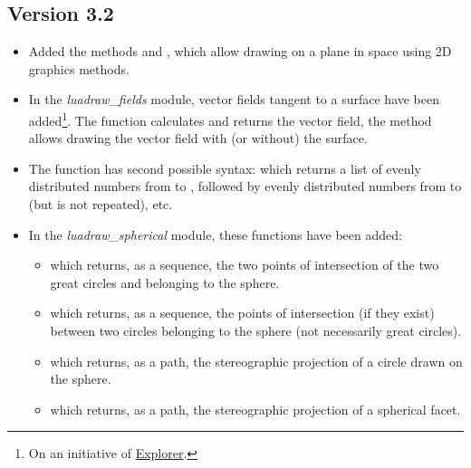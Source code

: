 \subsection{Version 3.2}

\begin{itemize}
    \item Added the methods  and , which allow drawing on a plane in space using 2D graphics methods.
    
    \item In the \emph{luadraw\_fields} module, vector fields tangent to a surface have been added\footnote{On an initiative of \href{https://tex.stackexchange.com/users/322482/explorer}{Explorer}.}. The  function calculates and returns the vector field, the  method allows drawing the vector field with (or without) the surface.
    
    \item The  function has second possible syntax:  which returns a list of  evenly distributed numbers from  to , followed by  evenly distributed numbers from  to  (but  is not repeated), etc.

    \item In the \emph{luadraw\_spherical} module, these functions have been added:
        \begin{itemize}
            \item {} which returns, as a sequence, the two points of intersection of the two great circles  and  belonging to the sphere.

            \item {} which returns, as a sequence, the points of intersection (if they exist) between two circles belonging to the sphere (not necessarily great circles).

            \item {} which returns, as a path, the stereographic projection of a circle drawn on the sphere.

            \item {} which returns, as a path, the stereographic projection of a spherical facet.
        \end{itemize}
    

\end{itemize}
